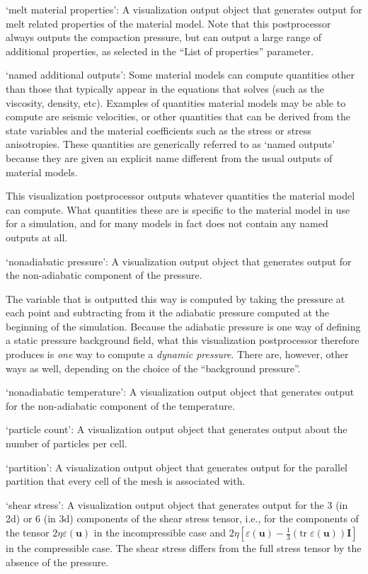 \begin{itemize}
`melt material properties': A visualization output object that generates output for melt related properties of the material model. Note that this postprocessor always outputs the compaction pressure, but can output a large range of additional properties, as selected in the ``List of properties'' parameter.

`named additional outputs': Some material models can compute quantities other than those that typically appear in the equations that \aspect{} solves (such as the viscosity, density, etc). Examples of quantities material models may be able to compute are seismic velocities, or other quantities that can be derived from the state variables and the material coefficients such as the stress or stress anisotropies. These quantities are generically referred to as `named outputs' because they are given an explicit name different from the usual outputs of material models.

This visualization postprocessor outputs whatever quantities the material model can compute. What quantities these are is specific to the material model in use for a simulation, and for many models in fact does not contain any named outputs at all.

`nonadiabatic pressure': A visualization output object that generates output for the non-adiabatic component of the pressure.

The variable that is outputted this way is computed by taking the pressure at each point and subtracting from it the adiabatic pressure computed at the beginning of the simulation. Because the adiabatic pressure is one way of defining a static pressure background field, what this visualization postprocessor therefore produces is \textit{one} way to compute a \textit{dynamic pressure}. There are, however, other ways as well, depending on the choice of the ``background pressure''.

`nonadiabatic temperature': A visualization output object that generates output for the non-adiabatic component of the temperature.

`particle count': A visualization output object that generates output about the number of particles per cell.

`partition': A visualization output object that generates output for the parallel partition that every cell of the mesh is associated with.

`shear stress': A visualization output object that generates output for the 3 (in 2d) or 6 (in 3d) components of the shear stress tensor, i.e., for the components of the tensor $2\eta\varepsilon(\mathbf u)$ in the incompressible case and $2\eta\left[\varepsilon(\mathbf u)-\tfrac 13(\textrm{tr}\;\varepsilon(\mathbf u))\mathbf I\right]$ in the compressible case. The shear stress differs from the full stress tensor by the absence of the pressure.


\end{itemize}
